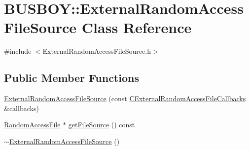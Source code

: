 \hypertarget{classBUSBOY_1_1ExternalRandomAccessFileSource}{
\section{BUSBOY::ExternalRandomAccessFileSource Class Reference}
\label{classBUSBOY_1_1ExternalRandomAccessFileSource}
}


{\ttfamily \#include $<$ExternalRandomAccessFileSource.h$>$}\subsection*{Public Member Functions}
\begin{DoxyCompactItemize}
\item 
\hyperlink{classBUSBOY_1_1ExternalRandomAccessFileSource_a599a29722158a180e5cef4459740dde3}{ExternalRandomAccessFileSource} (const \hyperlink{structCExternalRandomAccessFileCallbacksStruct}{CExternalRandomAccessFileCallbacks} \&callbacks)
\item 
\hyperlink{classBUSBOY_1_1RandomAccessFile}{RandomAccessFile} $\ast$ \hyperlink{classBUSBOY_1_1ExternalRandomAccessFileSource_a188851337801b1a9cb7c36a02273f638}{getFileSource} () const 
\item 
\hyperlink{classBUSBOY_1_1ExternalRandomAccessFileSource_a5ca3071047373e1d09f4d7162477d54b}{$\sim$ExternalRandomAccessFileSource} ()
\end{DoxyCompactItemize}


